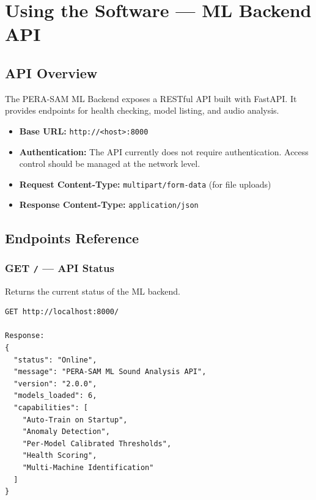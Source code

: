 \documentclass[10pt, a4paper, oneside]{report}
\begin{document}
\chapter{Using the Software --- ML Backend API}
\label{ch:api}

\section{API Overview}
\label{sec:api-overview}

The PERA-SAM ML Backend exposes a RESTful API built with FastAPI. It provides endpoints for health checking, model listing, and audio analysis.

\begin{itemize}[leftmargin=*, nosep]
  \item \textbf{Base URL:} \texttt{http://<host>:8000}
  \item \textbf{Authentication:} The API currently does not require authentication. Access control should be managed at the network level.
  \item \textbf{Request Content-Type:} \texttt{multipart/form-data} (for file uploads)
  \item \textbf{Response Content-Type:} \texttt{application/json}
\end{itemize}

\section{Endpoints Reference}
\label{sec:endpoints}

\subsection{GET \texttt{/} --- API Status}

Returns the current status of the ML backend.

\begin{lstlisting}[caption={API Status --- Request and Response}]
GET http://localhost:8000/

Response:
{
  "status": "Online",
  "message": "PERA-SAM ML Sound Analysis API",
  "version": "2.0.0",
  "models_loaded": 6,
  "capabilities": [
    "Auto-Train on Startup",
    "Anomaly Detection",
    "Per-Model Calibrated Thresholds",
    "Health Scoring",
    "Multi-Machine Identification"
  ]
}
\end{lstlisting}
\end{document}
